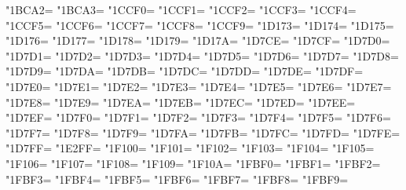 \XeTeXcharclass"1BCA2=\KclassNum
\XeTeXcharclass"1BCA3=\KclassNum
\XeTeXcharclass"1CCF0=\KclassNum
\XeTeXcharclass"1CCF1=\KclassNum
\XeTeXcharclass"1CCF2=\KclassNum
\XeTeXcharclass"1CCF3=\KclassNum
\XeTeXcharclass"1CCF4=\KclassNum
\XeTeXcharclass"1CCF5=\KclassNum
\XeTeXcharclass"1CCF6=\KclassNum
\XeTeXcharclass"1CCF7=\KclassNum
\XeTeXcharclass"1CCF8=\KclassNum
\XeTeXcharclass"1CCF9=\KclassNum
\XeTeXcharclass"1D173=\KclassNum
\XeTeXcharclass"1D174=\KclassNum
\XeTeXcharclass"1D175=\KclassNum
\XeTeXcharclass"1D176=\KclassNum
\XeTeXcharclass"1D177=\KclassNum
\XeTeXcharclass"1D178=\KclassNum
\XeTeXcharclass"1D179=\KclassNum
\XeTeXcharclass"1D17A=\KclassNum
\XeTeXcharclass"1D7CE=\KclassNum
\XeTeXcharclass"1D7CF=\KclassNum
\XeTeXcharclass"1D7D0=\KclassNum
\XeTeXcharclass"1D7D1=\KclassNum
\XeTeXcharclass"1D7D2=\KclassNum
\XeTeXcharclass"1D7D3=\KclassNum
\XeTeXcharclass"1D7D4=\KclassNum
\XeTeXcharclass"1D7D5=\KclassNum
\XeTeXcharclass"1D7D6=\KclassNum
\XeTeXcharclass"1D7D7=\KclassNum
\XeTeXcharclass"1D7D8=\KclassNum
\XeTeXcharclass"1D7D9=\KclassNum
\XeTeXcharclass"1D7DA=\KclassNum
\XeTeXcharclass"1D7DB=\KclassNum
\XeTeXcharclass"1D7DC=\KclassNum
\XeTeXcharclass"1D7DD=\KclassNum
\XeTeXcharclass"1D7DE=\KclassNum
\XeTeXcharclass"1D7DF=\KclassNum
\XeTeXcharclass"1D7E0=\KclassNum
\XeTeXcharclass"1D7E1=\KclassNum
\XeTeXcharclass"1D7E2=\KclassNum
\XeTeXcharclass"1D7E3=\KclassNum
\XeTeXcharclass"1D7E4=\KclassNum
\XeTeXcharclass"1D7E5=\KclassNum
\XeTeXcharclass"1D7E6=\KclassNum
\XeTeXcharclass"1D7E7=\KclassNum
\XeTeXcharclass"1D7E8=\KclassNum
\XeTeXcharclass"1D7E9=\KclassNum
\XeTeXcharclass"1D7EA=\KclassNum
\XeTeXcharclass"1D7EB=\KclassNum
\XeTeXcharclass"1D7EC=\KclassNum
\XeTeXcharclass"1D7ED=\KclassNum
\XeTeXcharclass"1D7EE=\KclassNum
\XeTeXcharclass"1D7EF=\KclassNum
\XeTeXcharclass"1D7F0=\KclassNum
\XeTeXcharclass"1D7F1=\KclassNum
\XeTeXcharclass"1D7F2=\KclassNum
\XeTeXcharclass"1D7F3=\KclassNum
\XeTeXcharclass"1D7F4=\KclassNum
\XeTeXcharclass"1D7F5=\KclassNum
\XeTeXcharclass"1D7F6=\KclassNum
\XeTeXcharclass"1D7F7=\KclassNum
\XeTeXcharclass"1D7F8=\KclassNum
\XeTeXcharclass"1D7F9=\KclassNum
\XeTeXcharclass"1D7FA=\KclassNum
\XeTeXcharclass"1D7FB=\KclassNum
\XeTeXcharclass"1D7FC=\KclassNum
\XeTeXcharclass"1D7FD=\KclassNum
\XeTeXcharclass"1D7FE=\KclassNum
\XeTeXcharclass"1D7FF=\KclassNum
\XeTeXcharclass"1E2FF=\KclassNum
\XeTeXcharclass"1F100=\KclassNum
\XeTeXcharclass"1F101=\KclassNum
\XeTeXcharclass"1F102=\KclassNum
\XeTeXcharclass"1F103=\KclassNum
\XeTeXcharclass"1F104=\KclassNum
\XeTeXcharclass"1F105=\KclassNum
\XeTeXcharclass"1F106=\KclassNum
\XeTeXcharclass"1F107=\KclassNum
\XeTeXcharclass"1F108=\KclassNum
\XeTeXcharclass"1F109=\KclassNum
\XeTeXcharclass"1F10A=\KclassNum
\XeTeXcharclass"1FBF0=\KclassNum
\XeTeXcharclass"1FBF1=\KclassNum
\XeTeXcharclass"1FBF2=\KclassNum
\XeTeXcharclass"1FBF3=\KclassNum
\XeTeXcharclass"1FBF4=\KclassNum
\XeTeXcharclass"1FBF5=\KclassNum
\XeTeXcharclass"1FBF6=\KclassNum
\XeTeXcharclass"1FBF7=\KclassNum
\XeTeXcharclass"1FBF8=\KclassNum
\XeTeXcharclass"1FBF9=\KclassNum

